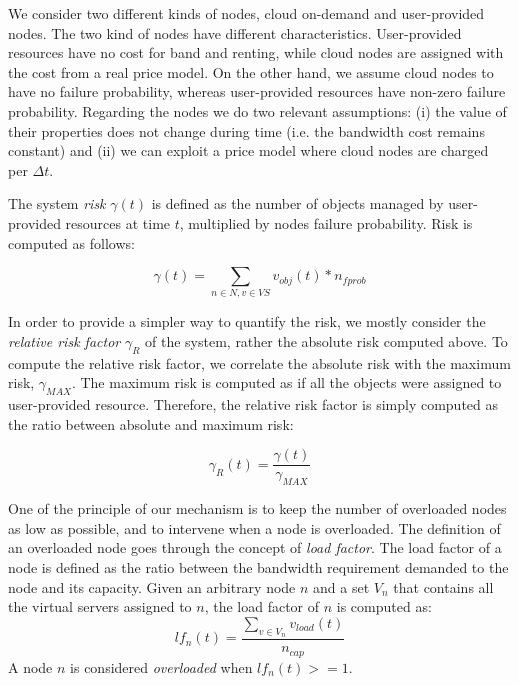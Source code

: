 \documentclass[final,10pt,a5paper]{phdimt}
\theoremstyle{definition}
\begin{document}
We consider two different kinds of nodes, cloud on-demand and user-provided nodes. The two kind of nodes have different characteristics.
User-provided resources have no cost for band and renting, while cloud nodes are assigned with the cost from a real price model.
On the other hand, we assume cloud nodes to have no failure probability, whereas user-provided resources have non-zero failure probability. Regarding the nodes we do two relevant assumptions: (i) the value of their properties does not change during time (i.e. the bandwidth cost remains constant) and (ii) we can exploit a price model where cloud nodes are charged per $\Delta{t}$.


The system \textit{risk} $\gamma(t)$ is defined as the number of objects managed by user-provided resources at time $t$, multiplied by nodes failure probability. Risk is computed as follows:

\begin{equation}
\gamma(t) =  \sum_{n \in N, v \in VS} v_{obj}(t) * n_{fprob}
\end{equation}

In order to provide a simpler way to quantify the risk, we mostly consider the \emph{relative risk factor} $\gamma_{R}$ of the system, rather the absolute risk computed above. To compute the relative risk factor, we correlate the absolute risk with the maximum risk, $\gamma_{MAX}$. The maximum risk is computed as if all the objects were assigned to user-provided resource. Therefore, the relative risk factor is simply computed as the ratio between absolute and maximum risk:


\begin{equation}
\gamma_R(t) =  \frac{\gamma(t)}{\gamma_{MAX}}
\end{equation}


One of the principle of our mechanism is to keep the number of overloaded nodes as low as possible, and to intervene when a node is overloaded.
The definition of an overloaded node goes through the concept of \textit{load factor}. The load factor of a node is defined as the ratio between the bandwidth requirement demanded to the node and its capacity.
Given an arbitrary node $n$ and a set $V_n$ that contains all the virtual servers assigned to $n$, the load factor of $n$ is computed as: 
\begin{equation}
lf_n(t) = \frac{\sum_{v \in V_n} v_{load}(t)}{n_{cap}}
\end{equation}
A node $n$ is considered \textit{overloaded} when $lf_n(t) >= 1$.
\end{document}
